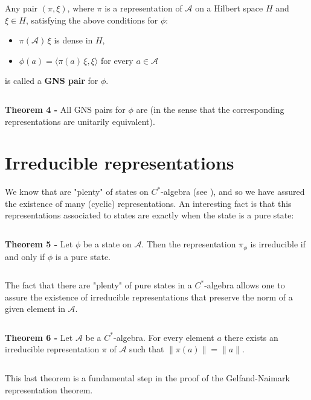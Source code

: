 \documentclass[12pt]{article}
\begin{document}
$\,$

Any pair $(\pi, \xi)$, where $\pi$ is a representation of $\mathcal{A}$ on a Hilbert space $H$ and $\xi \in H$, satisfying the above conditions for $\phi$:
\begin{itemize}
\item $\pi(\mathcal{A})\,\xi$ is dense in $H$,
\item $\phi(a) = \langle \pi(a)\,\xi, \xi\rangle$ for every $a \in \mathcal{A}$
\end{itemize}
is called a {\bf GNS pair} for $\phi$.

$\,$

{\bf Theorem 4 -} All GNS pairs for $\phi$ are  (in the sense that the corresponding representations are unitarily equivalent).


\section{Irreducible representations}

We know that are "plenty" of states on $C^*$-algebra (see ), and so we have assured the existence of many (cyclic) representations. An interesting fact is that this representations associated to states are  exactly when the state is a pure state:

$\,$

{\bf Theorem 5 -} Let $\phi$ be a state on $\mathcal{A}$. Then the representation $\pi_{\phi}$ is irreducible if and only if $\phi$ is a pure state.

$\,$

The fact that there are "plenty" of pure states in a $C^*$-algebra allows one to assure the existence of irreducible representations that preserve the norm of a given element in $\mathcal{A}$.

$\,$

{\bf Theorem 6 -} Let $\mathcal{A}$ be a $C^*$-algebra. For every element $a$ there exists an irreducible representation $\pi$ of $\mathcal{A}$ such that $\|\pi(a)\| = \|a\|$.

$\,$

This last theorem is a fundamental step in the proof of the Gelfand-Naimark representation theorem.
\end{document}
